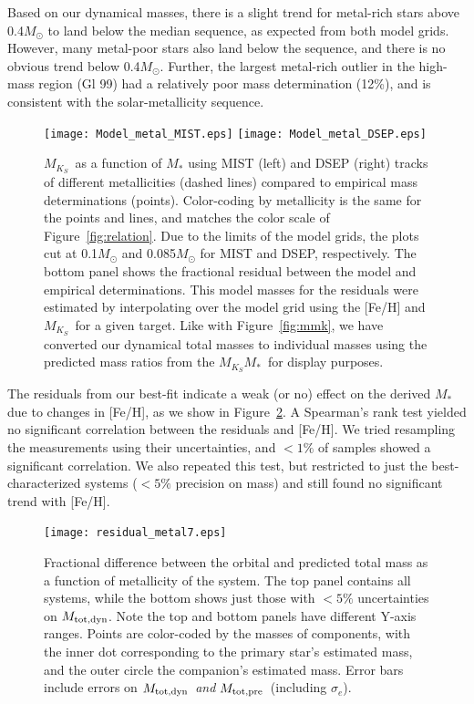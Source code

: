 \documentclass[twocolumn]{aastex62}
\newcommand{\mks}{$M_{K_S}$}
\newcommand{\mmk}{$M_{K_S}$\textendash$M_*$}
\newcommand{\mpred}{$M_{\rm{tot,pre}}$}
\newcommand{\mdyn}{$M_{\rm{tot,dyn}}$}
\begin{document}
Based on our dynamical masses, there is a slight trend for metal-rich stars above 0.4$M_\odot$ to land below the median sequence, as expected from both model grids. However, many metal-poor stars also land below the sequence, and there is no obvious trend below 0.4$M_\odot$. Further, the largest metal-rich outlier in the high-mass region (Gl 99) had a relatively poor mass determination (12\%), and is consistent with the solar-metallicity sequence. 

\begin{figure}[htp]
\begin{center}
\texttt{[image: Model\_metal\_MIST.eps]}
\texttt{[image: Model\_metal\_DSEP.eps]}
\caption{\mks\ as a function of $M_*$ using MIST (left) and DSEP (right) tracks of different metallicities (dashed lines) compared to empirical mass determinations (points). Color-coding by metallicity is the same for the points and lines, and matches the color scale of Figure~\ref{fig:relation}. Due to the limits of the model grids, the plots cut at 0.1$M_\odot$ and 0.085$M_\odot$ for MIST and DSEP, respectively. The bottom panel shows the fractional residual between the model and empirical determinations. This model masses for the residuals were estimated by interpolating over the model grid using the [Fe/H] and \mks\ for a given target. Like with Figure~\ref{fig:mmk}, we have converted our dynamical total masses to individual masses using the predicted mass ratios from the \mmk\ for display purposes. }
\label{fig:mk_metal}
\end{center}
\end{figure}

The residuals from our best-fit indicate a weak (or no) effect on the derived $M_*$ due to changes in [Fe/H], as we show in Figure~\ref{fig:metal_resid}. A Spearman's rank test yielded no significant correlation between the residuals and [Fe/H]. We tried resampling the measurements using their uncertainties, and $<1\%$ of samples showed a significant correlation. We also repeated this test, but restricted to just the best-characterized systems ($<5\%$ precision on mass) and still found no significant trend with [Fe/H]. 

\begin{figure}[htp]
\begin{center}
\texttt{[image: residual\_metal7.eps]}
\caption{Fractional difference between the orbital and predicted total mass as a function of metallicity of the system. The top panel contains all systems, while the bottom shows just those with $<5\%$ uncertainties on \mdyn. Note the top and bottom panels have different Y-axis ranges. Points are color-coded by the masses of components, with the inner dot corresponding to the primary star's estimated mass, and the outer circle the companion's estimated mass. Error bars include errors on \mdyn\ {\it and} \mpred\ (including $\sigma_e$).}
\label{fig:metal_resid}
\end{center}
\end{figure}
\end{document}
